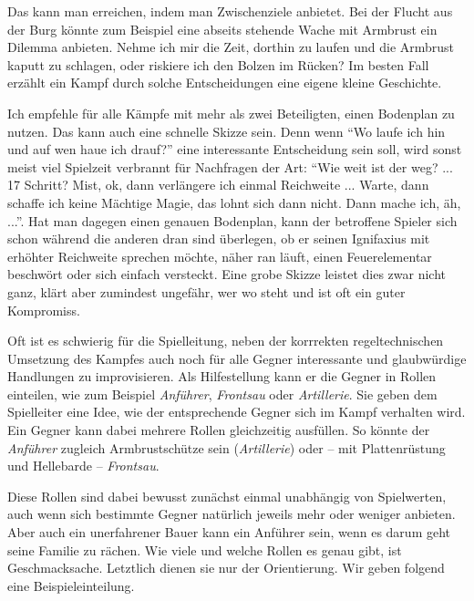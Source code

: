 Das kann man erreichen, indem man Zwischenziele anbietet.
Bei der Flucht aus der Burg könnte zum Beispiel eine abseits stehende Wache mit Armbrust ein Dilemma anbieten.
Nehme ich mir die Zeit, dorthin zu laufen und die Armbrust kaputt zu schlagen, oder riskiere ich den Bolzen im Rücken?
Im besten Fall erzählt ein Kampf durch solche Entscheidungen eine eigene kleine Geschichte.

Ich empfehle für alle Kämpfe mit mehr als zwei Beteiligten, einen Bodenplan zu nutzen.
Das kann auch eine schnelle Skizze sein.
Denn wenn \enquote{Wo laufe ich hin und auf wen haue ich drauf?} eine interessante Entscheidung sein soll, wird sonst meist viel Spielzeit verbrannt für Nachfragen der Art: \enquote{Wie weit ist der weg? ... 17 Schritt? Mist, ok, dann verlängere ich einmal Reichweite ... Warte, dann schaffe ich keine Mächtige Magie, das lohnt sich dann nicht. Dann mache ich, äh, ...}.
Hat man dagegen einen genauen Bodenplan, kann der betroffene Spieler sich schon während die anderen dran sind überlegen, ob er seinen Ignifaxius mit erhöhter Reichweite sprechen möchte, näher ran läuft, einen Feuerelementar beschwört oder sich einfach versteckt. Eine grobe Skizze leistet dies zwar nicht ganz, klärt aber zumindest ungefähr, wer wo steht und ist oft ein guter Kompromiss.

\vfill


\neueseite

Oft ist es schwierig für die Spielleitung, neben der korrrekten regeltechnischen Umsetzung des Kampfes auch noch für alle Gegner interessante und glaubwürdige Handlungen zu improvisieren.
Als Hilfestellung kann er die Gegner in Rollen einteilen, wie zum Beispiel \textit{Anführer}, \textit{Frontsau} oder \textit{Artillerie}.
Sie geben dem Spielleiter eine Idee, wie der entsprechende Gegner sich im Kampf verhalten wird.
Ein Gegner kann dabei mehrere Rollen gleichzeitig ausfüllen. So könnte der \textit{Anführer} zugleich Armbrustschütze sein (\textit{Artillerie})
oder -- mit Plattenrüstung und Hellebarde -- \textit{Frontsau}. 

Diese Rollen sind dabei bewusst zunächst einmal unabhängig von Spielwerten, auch wenn sich bestimmte Gegner natürlich jeweils mehr oder weniger anbieten.
Aber auch ein unerfahrener Bauer kann ein Anführer sein, wenn es darum geht seine Familie zu rächen.
Wie viele und welche Rollen es genau gibt, ist Geschmacksache.
Letztlich dienen sie nur der Orientierung.
Wir geben folgend eine Beispieleinteilung.

